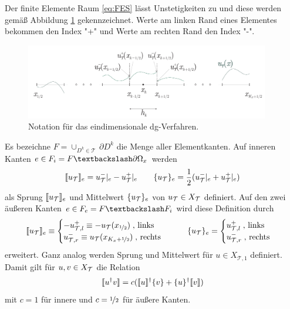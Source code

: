 Der finite Elemente Raum \eqref{eq:FES} lässt Unstetigkeiten zu und diese werden gemäß Abbildung \ref{fig:notation_DG} gekennzeichnet. Werte am linken Rand eines Elementes bekommen den Index "+" und Werte am rechten Rand den Index "-".
\begin{figure}
  \centering
  \includegraphics[width=0.95\textwidth]{files/notationDG.pdf}
  \caption{Notation für das eindimensionale \ac{dg}-Verfahren.}
  \label{fig:notation_DG}
\end{figure}
\begin{definition}\label{def:jump}
Es bezeichne $F=\cup_{D^k\in\mathcal{T}} \, \partial D^k$ die Menge aller Elementkanten. Auf inneren Kanten $e\in F_i=F  \textbackslash \partial\Omega_x$ werden
\begin{equation}
  \llbracket u_{\mathcal{T}} \rrbracket_e = u_{\mathcal{T}}^-|_e - u_{\mathcal{T}}^+|_e \qquad \{ u_{\mathcal{T}} \}_e = \frac{1}{2} (u_{\mathcal{T}}^-|_e + u_{\mathcal{T}}^+|_e)
  \label{eq:jump_def_inner}
\end{equation}
als Sprung $\llbracket u_{\mathcal{T}} \rrbracket_e$ und Mittelwert $\{ u_{\mathcal{T}} \}_e$ von $u_{\mathcal{T}} \in X_{\mathcal{T}}$ definiert. Auf den zwei äußeren Kanten $e\in F_e = F \textbackslash F_i$ wird diese Definition durch
\begin{equation}
  \llbracket u_{\mathcal{T}} \rrbracket_e \equiv
        \begin{cases}
          -u_{\mathcal{T},l}^+ \equiv -u_{\mathcal{T}}(x_{\nicefrac{1}{2}})     \; \text{, links}\\
           u_{\mathcal{T},r}^- \equiv  u_{\mathcal{T}}(x_{K_x+\nicefrac{1}{2}}) \; \text{, rechts}
        \end{cases}
   \qquad \{ u_{\mathcal{T}} \}_e = \begin{cases} u_{\mathcal{T},l}^+ \; \text{, links}\\ u_{\mathcal{T},r}^- \; \text{, rechts}\\  \end{cases}
   \label{eq:jump_def_outer}
\end{equation}
erweitert. Ganz analog werden Sprung und Mittelwert für $u \in X_{\mathcal{T},1}$ definiert. Damit gilt für  $u,v\in X_{\mathcal{T}}$ die Relation
\begin{equation}
  \llbracket u^{\dagger}v \rrbracket = c(\llbracket u \rrbracket^{\dagger}\{ v \} + \{ u \}^{\dagger}\llbracket v \rrbracket)
  \label{eq:jump_relation}
\end{equation}
mit $c=1$ für innere und $c=\nicefrac{1}{2}$ für äußere Kanten.
\end{definition}
